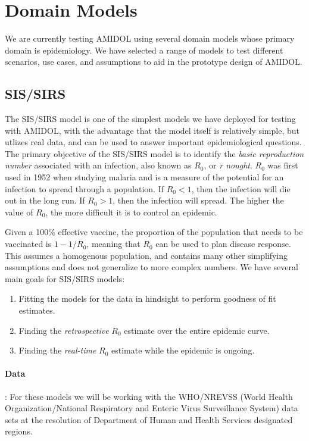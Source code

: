 \documentclass[11pt]{article}
\newcommand{\amidol}{\textsc{AMIDOL}}
\begin{document}
\section{Domain Models}

We are currently testing \amidol{} using several domain models whose primary domain is epidemiology.  We have selected a range of models to test different scenarios, use cases, and assumptions to aid in the prototype design of \amidol{}.

\subsection{SIS/SIRS}

The SIS/SIRS model is one of the simplest models we have deployed for testing with \amidol{}, with the advantage that the model itself is relatively simple, but utlizes real data, and can be used to answer important epidemiological questions.  The primary objective of the SIS/SIRS model is to identify the \emph{basic reproduction number} associated with an infection, also known as $R_0$, or \emph{r nought}.  $R_0$ was first used in 1952 when studying malaria and is a measure of the potential for an infection to spread through a population.  If $R_0 < 1$, then the infection will die out in the long run.  If $R_0 > 1$, then the infection will spread.  The higher the value of $R_0$, the more difficult it is to control an epidemic.

Given a 100\% effective vaccine, the proportion of the population that needs to be vaccinated is $1 - 1/R_0$, meaning that $R_0$ can be used to plan disease response.  This assumes a homogenous population, and contains many other simplifying assumptions and does not generalize to more complex numbers.  We have several main goals for SIS/SIRS models:

\begin{enumerate}
\item Fitting the models for the data in hindsight to perform goodness of fit estimates.
\item Finding the \emph{retrospective} $R_0$ estimate over the entire epidemic curve.
\item Finding the \emph{real-time} $R_0$ estimate while the epidemic is ongoing.
\end{enumerate}

\paragraph{Data}: For these models we will be working with the WHO/NREVSS (World Health Organization/National Respiratory and Enteric Virus Surveillance System) data sets at the resolution of Department of Human and Health Services designated regions.
\end{document}
